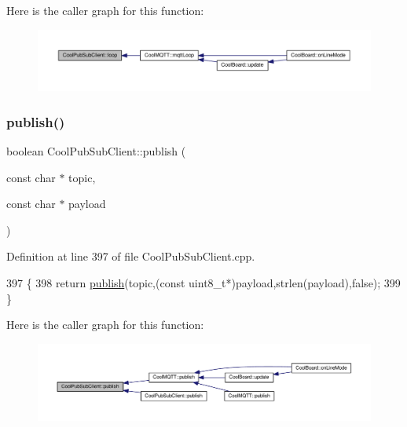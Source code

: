 Here is the caller graph for this function\+:\nopagebreak
\begin{figure}[H]
\begin{center}
\leavevmode
\includegraphics[width=350pt]{d8/d4b/class_cool_pub_sub_client_afc15900f0fc4886a19394508e61793b8_icgraph}
\end{center}
\end{figure}
\mbox{\label{class_cool_pub_sub_client_ab6ad5fa2d3db8f91454027257f225a89}} 
\subsubsection{\texorpdfstring{publish()}{publish()}\hspace{0.1cm}{\footnotesize\ttfamily [1/4]}}
{\footnotesize\ttfamily boolean Cool\+Pub\+Sub\+Client\+::publish (\begin{DoxyParamCaption}\item[{const char $\ast$}]{topic,  }\item[{const char $\ast$}]{payload }\end{DoxyParamCaption})}



Definition at line 397 of file Cool\+Pub\+Sub\+Client.\+cpp.


\begin{DoxyCode}
397                                                                         \{
398     \textcolor{keywordflow}{return} \hyperlink{class_cool_pub_sub_client_ab6ad5fa2d3db8f91454027257f225a89}{publish}(topic,(\textcolor{keyword}{const} uint8\_t*)payload,strlen(payload),\textcolor{keyword}{false});
399 \}
\end{DoxyCode}
Here is the caller graph for this function\+:\nopagebreak
\begin{figure}[H]
\begin{center}
\leavevmode
\includegraphics[width=350pt]{d8/d4b/class_cool_pub_sub_client_ab6ad5fa2d3db8f91454027257f225a89_icgraph}
\end{center}
\end{figure}
\mbox{\label{class_cool_pub_sub_client_a0b01cef98af0b57d8da4df373e196448}} 
